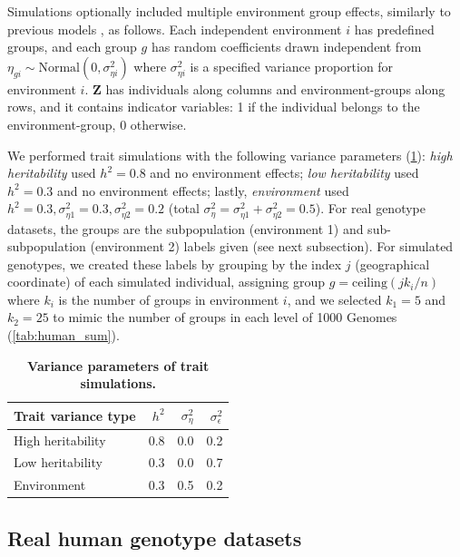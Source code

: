 \documentclass[11pt]{article}
\begin{document}
\begin{linenumbers}
Simulations optionally included multiple environment group effects, similarly to previous models \citep{zhang_principal_2015, wang_trade-offs_2022}, as follows.
Each independent environment $i$ has predefined groups, and each group $g$ has random coefficients drawn independent from $\eta_{gi} \sim \text{Normal}( 0, \sigma^2_{\eta i} )$ where $\sigma^2_{\eta i}$ is a specified variance proportion for environment $i$.
$\mathbf{Z}$ has individuals along columns and environment-groups along rows, and it contains indicator variables: 1 if the individual belongs to the environment-group, 0 otherwise.

We performed trait simulations with the following variance parameters (\cref{tab:trait-var-sim}):
\textit{high heritability} used $h^2 = 0.8$ and no environment effects;
\textit{low heritability} used $h^2 = 0.3$ and no environment effects;
lastly,
\textit{environment} used $h^2 = 0.3, \sigma^2_{\eta 1} = 0.3, \sigma^2_{\eta 2} = 0.2$ (total $\sigma^2_\eta = \sigma^2_{\eta 1} + \sigma^2_{\eta 2} = 0.5$).
For real genotype datasets, the groups are the subpopulation (environment 1) and sub-subpopulation (environment 2) labels given (see next subsection).
For simulated genotypes, we created these labels by grouping by the index $j$ (geographical coordinate) of each simulated individual, assigning group $g = \text{ceiling}( j k_i / n )$ where $k_i$ is the number of groups in environment $i$, and we selected $k_1 = 5$ and $k_2 = 25$ to mimic the number of groups in each level of 1000 Genomes (\cref{tab:human_sum}).

\begin{table}[b!]
  \centering
  \caption{
    \textbf{Variance parameters of trait simulations.}
  }
  \label{tab:trait-var-sim}
  \begin{tabular}{lrrr}
    \toprule
    Trait variance type & $h^2$ & $\sigma^2_\eta$ & $\sigma^2_\epsilon$ \\
    \midrule
    High heritability & 0.8 & 0.0 & 0.2 \\
    Low heritability  & 0.3 & 0.0 & 0.7 \\
    Environment       & 0.3 & 0.5 & 0.2 \\
    \bottomrule
  \end{tabular}
\end{table}

\subsection{Real human genotype datasets}


\end{linenumbers}
\end{document}
